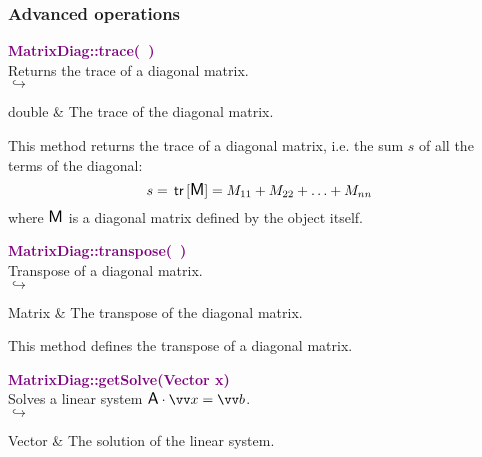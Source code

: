 \subsubsection{Advanced operations}

\textcolor{purple}{\textbf{MatrixDiag::trace(~)}}\label{MatrixDiag::trace()}\\
Returns the trace of a diagonal matrix.\\ \hspace*{5mm}$\hookrightarrow$
\vspace*{-2em}\begin{tcolorbox}[grow to left by=-1cm, width=\textwidth-1cm,myArgs,tabularx={l|R}]
double & The trace of the diagonal matrix.
\end{tcolorbox}

This method returns the trace of a diagonal matrix, i.e. the sum $s$ of all the terms of the diagonal:
\begin{equation*}
s = \mbox{\ensuremath{\mathsf{\,tr\,}}}[\mbox{\large\ensuremath{\mathsf{M}}}] = M_{11}+M_{22}+\hdots+M_{nn}
\end{equation*}
where $\mbox{\large\ensuremath{\mathsf{M}}}$ is a diagonal matrix defined by the object itself.

\textcolor{purple}{\textbf{MatrixDiag::transpose(~)}}\label{MatrixDiag::transpose()}\\
Transpose of a diagonal matrix.\\ \hspace*{5mm}$\hookrightarrow$
\vspace*{-2em}\begin{tcolorbox}[grow to left by=-1cm, width=\textwidth-1cm,myArgs,tabularx={l|R}]
Matrix & The transpose of the diagonal matrix.
\end{tcolorbox}

This method defines the transpose of a diagonal matrix.

\textcolor{purple}{\textbf{MatrixDiag::getSolve(Vector x)}}\label{MatrixDiag::getSolve(Vector x)}\\
Solves a linear system $\A\cdot \overrightarrow{x} = \overrightarrow{b}$.\\ \hspace*{5mm}$\hookrightarrow$
\vspace*{-2em}\begin{tcolorbox}[grow to left by=-1cm, width=\textwidth-1cm,myArgs,tabularx={l|R}]
Vector & The solution of the linear system.
\end{tcolorbox}

